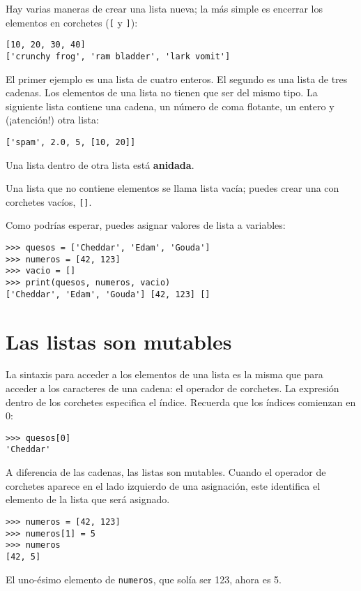 \documentclass[10pt]{book}
\begin{document}
Hay varias maneras de crear una lista nueva; la más simple es
encerrar los elementos en corchetes (\verb"[" y \verb"]"):

\begin{verbatim}
[10, 20, 30, 40]
['crunchy frog', 'ram bladder', 'lark vomit']
\end{verbatim}
%
El primer ejemplo es una lista de cuatro enteros.  El segundo es una lista de
tres cadenas.  Los elementos de una lista no tienen que ser del mismo tipo.
La siguiente lista contiene una cadena, un número de coma flotante, un entero y
(¡atención!) otra lista:

\begin{verbatim}
['spam', 2.0, 5, [10, 20]]
\end{verbatim}
%
Una lista dentro de otra lista está {\bf anidada}.

Una lista que no contiene elementos se
llama lista vacía; puedes crear una con corchetes
vacíos, \verb"[]".

Como podrías esperar, puedes asignar valores de lista a variables:

\begin{verbatim}
>>> quesos = ['Cheddar', 'Edam', 'Gouda']
>>> numeros = [42, 123]
>>> vacio = []
>>> print(quesos, numeros, vacio)
['Cheddar', 'Edam', 'Gouda'] [42, 123] []
\end{verbatim}
%


\section{Las listas son mutables}
\label{mutable}

La sintaxis para acceder a los elementos de una lista es la misma que para
acceder a los caracteres de una cadena: el operador de corchetes.  La
expresión dentro de los corchetes especifica el índice.  Recuerda que los
índices comienzan en 0:

\begin{verbatim}
>>> quesos[0]
'Cheddar'
\end{verbatim}
%
A diferencia de las cadenas, las listas son mutables.  Cuando el operador de corchetes aparece
en el lado izquierdo de una asignación, este identifica el elemento de la
lista que será asignado.

\begin{verbatim}
>>> numeros = [42, 123]
>>> numeros[1] = 5
>>> numeros
[42, 5]
\end{verbatim}
%
El uno-ésimo elemento de {\tt numeros}, que
solía ser 123, ahora es 5.
\end{document}
